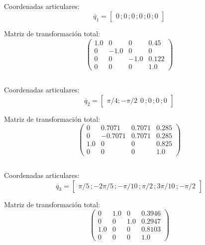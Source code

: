 \documentclass[a4paper,12pt]{article}
\begin{document}
\subsection{}
Coordenadas articulares:
\begin{equation*}
    \overline{q}_1 = 
    \begin{bmatrix}
        0\,;0\,;0\,;0\,;0\,;0
    \end{bmatrix}
\end{equation*}

Matriz de transformación total:
\[\left(\begin{array}{cccc} 1.0 & 0 & 0 & 0.45\\ 0 & -1.0 & 0 & 0\\ 0 & 0 & -1.0 & 0.122\\ 0 & 0 & 0 & 1.0 \end{array}\right)\]

\subsection{}
Coordenadas articulares:
\begin{equation*}
    \overline{q}_2 = 
    \begin{bmatrix}
        \pi/4;-\pi/2\,\;0\,;0\,;0\,;0
    \end{bmatrix}
\end{equation*}

Matriz de transformación total:
\[\left(\begin{array}{cccc} 0 & 0.7071 & 0.7071 & 0.285\\ 0 & -0.7071 & 0.7071 & 0.285\\ 1.0 & 0 & 0 & 0.825\\ 0 & 0 & 0 & 1.0 \end{array}\right)\]

\subsection{}
Coordenadas articulares:
\begin{equation*}
    \overline{q}_3 = 
    \begin{bmatrix}
        \pi/5\,;-2\pi/5\,;-\pi/10\,;\pi/2\,;3\pi/10\,;-\pi/2
    \end{bmatrix}
\end{equation*}

Matriz de transformación total:
\[\left(\begin{array}{cccc} 0 & 1.0 & 0 & 0.3946\\ 0 & 0 & 1.0 & 0.2947\\ 1.0 & 0 & 0 & 0.8103\\ 0 & 0 & 0 & 1.0 \end{array}\right)\]
\end{document}
